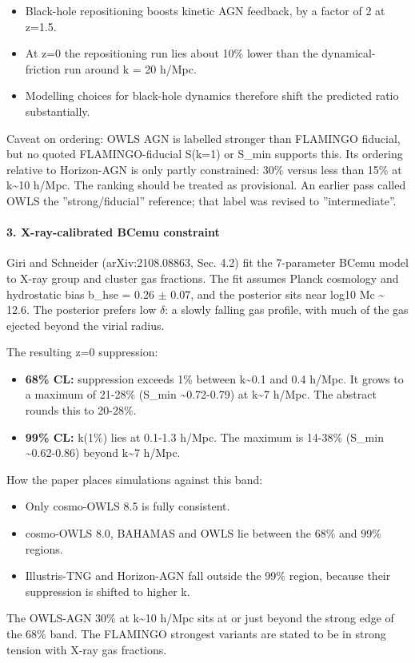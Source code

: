 \documentclass[11pt,a4paper]{article}
\begin{document}
\begin{itemize}
  \item Black-hole repositioning boosts kinetic AGN feedback, by a factor of 2 at z=1.5.
  \item At z=0 the repositioning run lies about 10\% lower than the dynamical-friction run around k = 20 h/Mpc.
  \item Modelling choices for black-hole dynamics therefore shift the predicted ratio substantially.
\end{itemize}
Caveat on ordering: OWLS AGN is labelled stronger than FLAMINGO fiducial, but no quoted FLAMINGO-fiducial S(k=1) or S\_min supports this. Its ordering relative to Horizon-AGN is only partly constrained: 30\% versus less than 15\% at k\textasciitilde{}10 h/Mpc. The ranking should be treated as provisional. An earlier pass called OWLS the ''strong/fiducial'' reference; that label was revised to ''intermediate''.

\paragraph{3. X-ray-calibrated BCemu constraint}
Giri and Schneider (arXiv:2108.08863, Sec. 4.2) fit the 7-parameter BCemu model to X-ray group and cluster gas fractions. The fit assumes Planck cosmology and hydrostatic bias b\_hse = 0.26 $\pm$ 0.07, and the posterior sits near log10 Mc \textasciitilde{} 12.6. The posterior prefers low $\delta$: a slowly falling gas profile, with much of the gas ejected beyond the virial radius.

The resulting z=0 suppression:

\begin{itemize}
  \item \textbf{68\% CL:} suppression exceeds 1\% between k\textasciitilde{}0.1 and 0.4 h/Mpc. It grows to a maximum of 21-28\% (S\_min \textasciitilde{}0.72-0.79) at k\textasciitilde{}7 h/Mpc. The abstract rounds this to 20-28\%.
  \item \textbf{99\% CL:} k(1\%) lies at 0.1-1.3 h/Mpc. The maximum is 14-38\% (S\_min \textasciitilde{}0.62-0.86) beyond k\textasciitilde{}7 h/Mpc.
\end{itemize}
How the paper places simulations against this band:

\begin{itemize}
  \item Only cosmo-OWLS 8.5 is fully consistent.
  \item cosmo-OWLS 8.0, BAHAMAS and OWLS lie between the 68\% and 99\% regions.
  \item Illustris-TNG and Horizon-AGN fall outside the 99\% region, because their suppression is shifted to higher k.
\end{itemize}
The OWLS-AGN 30\% at k\textasciitilde{}10 h/Mpc sits at or just beyond the strong edge of the 68\% band. The FLAMINGO strongest variants are stated to be in strong tension with X-ray gas fractions.
\end{document}
